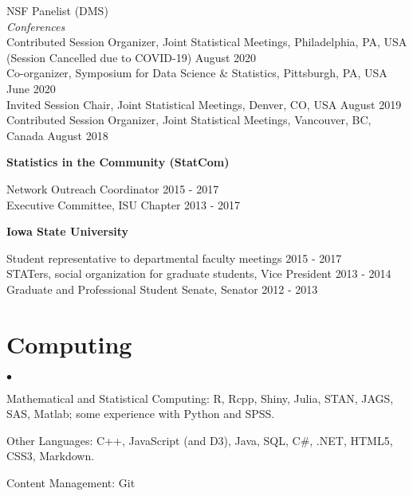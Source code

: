 \documentclass[margin,line]{res}
\newenvironment{list2}{
  \begin{list}{$\bullet$}{%
      \setlength{\itemsep}{0in}
      \setlength{\parsep}{0in} \setlength{\parskip}{0in}
      \setlength{\topsep}{0in} \setlength{\partopsep}{0in}
      \setlength{\leftmargin}{0.2in}}}{\end{list}}
\begin{document}
\begin{resume}
\vspace{-.3cm}
NSF Panelist (DMS) \\

\vspace{-.3cm}
{\em Conferences} \\
Contributed Session Organizer, Joint Statistical Meetings, Philadelphia, PA, USA (Session Cancelled due to COVID-19) \hfill {August 2020} \\
Co-organizer, Symposium for Data Science \& Statistics, Pittsburgh, PA, USA \hfill {June 2020} \\
Invited Session Chair, Joint Statistical Meetings, Denver, CO, USA \hfill {August 2019} \\
Contributed Session Organizer, Joint Statistical Meetings, Vancouver, BC, Canada \hfill {August 2018}

{\bf Statistics in the Community (StatCom)}

\vspace{-.3cm}
Network Outreach Coordinator \hfill {2015 - 2017}\\
Executive Committee, ISU Chapter \hfill {2013 - 2017}

{\bf Iowa State University}

\vspace{-.3cm}
Student representative to departmental faculty meetings \hfill {2015 - 2017}\\
STATers, social organization for graduate students, Vice President \hfill {2013 - 2014}\\
Graduate and Professional Student Senate, Senator \hfill {2012 - 2013}



\section{\sc Computing}
\begin{list2}
\item Mathematical and Statistical Computing:  R, Rcpp, Shiny, Julia, STAN, JAGS, SAS, Matlab; some experience  with Python and SPSS.
\item Other Languages: C++, JavaScript (and D3), Java, SQL, C\#, .NET, HTML5, CSS3, Markdown.
\item Content Management: Git
\end{list2}


\end{resume}
\end{document}
